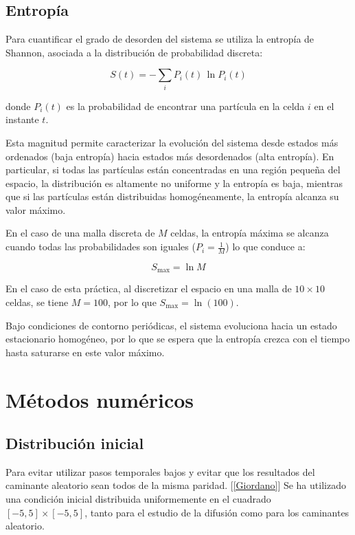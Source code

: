 \documentclass[11pt,a4paper]{article}
\begin{document}
\subsection{Entropía}

Para cuantificar el grado de desorden del sistema se utiliza la entropía de Shannon, asociada a la distribución de probabilidad discreta:

\begin{equation}
S(t) = -\sum_i P_i(t)\,\ln P_i(t)
\end{equation}

donde $P_i(t)$ es la probabilidad de encontrar una partícula en la celda $i$ en el instante $t$.

Esta magnitud permite caracterizar la evolución del sistema desde estados más ordenados (baja entropía) hacia estados más desordenados (alta entropía). En particular, si todas las partículas están concentradas en una región pequeña del espacio, la distribución es altamente no uniforme y la entropía es baja, mientras que si las partículas están distribuidas homogéneamente, la entropía alcanza su valor máximo.

En el caso de una malla discreta de $M$ celdas, la entropía máxima se alcanza cuando todas las probabilidades son iguales ($P_i = \frac{1}{M}$) lo que conduce a:

\begin{equation}
S_{\text{max}} = \ln M
\end{equation}

En el caso de esta práctica, al discretizar el espacio en una malla de $10 \times 10$ celdas, se tiene $M = 100$, por lo que $S_{\text{max}} = \ln(100)$.

Bajo condiciones de contorno periódicas, el sistema evoluciona hacia un estado estacionario homogéneo, por lo que se espera que la entropía crezca con el tiempo hasta saturarse en este valor máximo.

\section{Métodos numéricos}

\subsection{Distribución inicial}

Para evitar utilizar pasos temporales bajos y evitar que los resultados del caminante aleatorio sean todos de la misma paridad. [\ref{Giordano}] Se ha utilizado una condición inicial distribuida uniformemente en el cuadrado $[-5,5]\times[-5,5]$, tanto para el estudio de la difusión como para los caminantes aleatorio.
\end{document}
